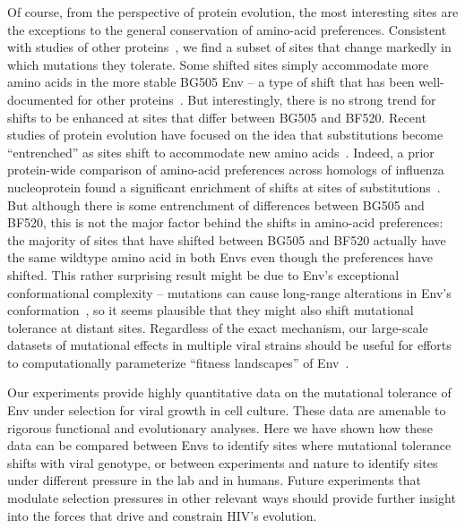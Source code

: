 \documentclass[9pt]{elife}
\begin{document}
Of course, from the perspective of protein evolution, the most interesting sites are the exceptions to the general conservation of amino-acid preferences.
Consistent with studies of other proteins~\citep{natarajan2013epistasis,harms2014historical,doud2015site,starr2017pervasive}, we find a subset of sites that change markedly in which mutations they tolerate.
Some shifted sites simply accommodate more amino acids in the more stable BG505 Env -- a type of shift that has been well-documented for other proteins~\citep{wang2002evolution,bloom2006protein,gong2013stability,kumar2017stability}.
But interestingly, there is no strong trend for shifts to be enhanced at sites that differ between BG505 and BF520.
Recent studies of protein evolution have focused on the idea that substitutions become ``entrenched'' as sites shift to accommodate new amino acids~\citep{pollock2012amino,shah2015contingency,bazykin2015changing,starr2017pervasive}.
Indeed, a prior protein-wide comparison of amino-acid preferences across homologs of influenza nucleoprotein found a significant enrichment of shifts at sites of substitutions~\citep{doud2015site}.
But although there is some entrenchment of differences between BG505 and BF520, this is not the major factor behind the shifts in amino-acid preferences: the majority of sites that have shifted between BG505 and BF520 actually have the same wildtype amino acid in both Envs even though the preferences have shifted.
This rather surprising result might be due to Env's exceptional conformational complexity -- mutations can cause long-range alterations in Env's conformation~\citep{kwong2000structures,white2010molecular,almond2010structural,davenport2013isolate}, so it seems plausible that they might also shift mutational tolerance at distant sites. 
Regardless of the exact mechanism, our large-scale datasets of mutational effects in multiple viral strains should be useful for efforts to computationally parameterize ``fitness landscapes'' of Env~\citep{kouyos2012exploring,ferguson2013translating,mann2014fitness,barton2015scaling,louie2018fitness}.

Our experiments provide highly quantitative data on the mutational tolerance of Env under selection for viral growth in cell culture.
These data are amenable to rigorous functional and evolutionary analyses.
Here we have shown how these data can be compared between Envs to identify sites where mutational tolerance shifts with viral genotype, or between experiments and nature to identify sites under different pressure in the lab and in humans.
Future experiments that modulate selection pressures in other relevant ways should provide further insight into the forces that drive and constrain HIV's evolution.
\end{document}
